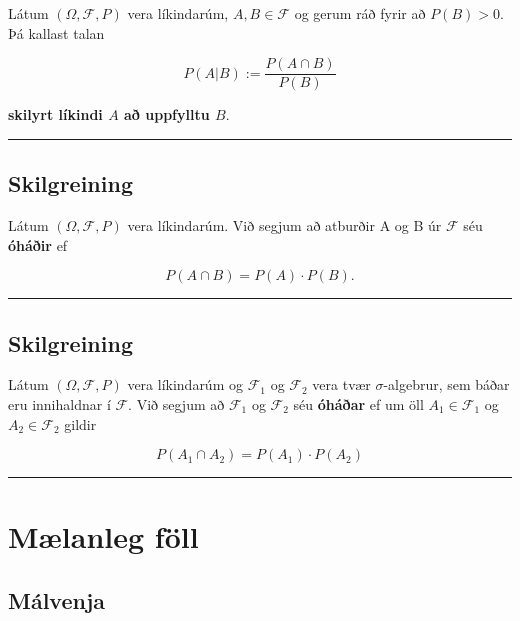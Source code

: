 \documentclass[]{book}
\begin{document}
Látum \((\Omega, \mathcal F, P)\) vera líkindarúm, \(A, B \in \mathcal F\) og gerum ráð fyrir að \(P(B) > 0\). Þá kallast talan

\[
P(A|B) := \frac{P(A\cap B)}{P(B)}
\]

\textbf{skilyrt líkindi \(A\) að uppfylltu \(B\)}.

\begin{center}\rule{0.5\linewidth}{\linethickness}\end{center}

\hypertarget{skilgreining-12}{%
\section{Skilgreining}\label{skilgreining-12}}

Látum \((\Omega, \mathcal F, P)\) vera líkindarúm. Við segjum að atburðir A og B úr \(\mathcal F\) séu \textbf{óháðir} ef

\[
P(A\cap B) = P(A) \cdot P(B).
\]

\begin{center}\rule{0.5\linewidth}{\linethickness}\end{center}

\hypertarget{skilgreining-13}{%
\section{Skilgreining}\label{skilgreining-13}}

Látum \((\Omega, \mathcal F, P)\) vera líkindarúm og \(\mathcal F_1\) og \(\mathcal F_2\) vera tvær \(\sigma\)-algebrur, sem báðar eru innihaldnar í \(\mathcal F\). Við segjum að \(\mathcal F_1\) og \(\mathcal F_2\) séu \textbf{óháðar} ef um öll \(A_1 \in \mathcal F_1\) og \(A_2 \in \mathcal F_2\) gildir

\[
P(A_1 \cap A_2) = P(A_1) \cdot P(A_2)
\]

\begin{center}\rule{0.5\linewidth}{\linethickness}\end{center}

\hypertarget{mlanleg-foll}{%
\chapter{Mælanleg föll}\label{mlanleg-foll}}

\hypertarget{malvenja}{%
\section{Málvenja}\label{malvenja}}
\end{document}

